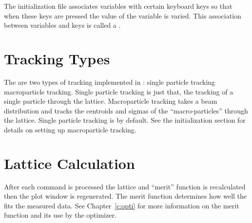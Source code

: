 The  initialization file associates variables with
certain keyboard keys so that when these keys are pressed the value of
the variable is varied. This association between variables and keys is
called a .

\section{Tracking Types}

The are two types of tracking implemented in \tap: single particle tracking 
macroparticle tracking. Single particle tracking is just that, the tracking 
of a single particle through the lattice. Macroparticle tracking takes a beam distribution
and tracks the centroids and sigmas of the ``macro-particles'' through the lattice.
Single particle tracking is by default. See the initialization section for details on
setting up macroparticle tracking.

\section{Lattice Calculation}

After each \tao command is processed the lattice and ``merit'' function is 
recalculated then the plot window is regenerated. The
merit function determines how well the  fits the measured data. See
Chapter~\ref{c:opti} for more information on the merit function and its use by
the optimizer. 

